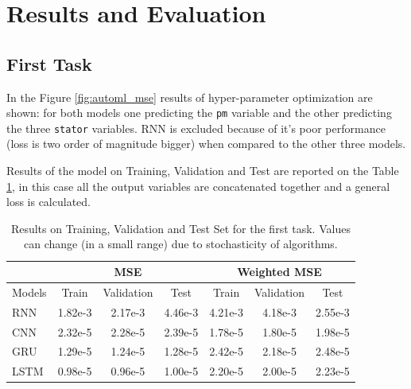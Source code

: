 \section{Results and Evaluation}
 
\subsection{First Task}
In the Figure \ref{fig:automl_mse} results of hyper-parameter optimization are shown: for both models one predicting the \verb|pm| variable and the other predicting the three \verb|stator| variables. RNN is excluded because of it's poor performance (loss is two order of magnitude bigger) when compared to the other three models.

Results of the model on Training, Validation and Test are reported on the Table \ref{tab:first}, in this case all the output variables are concatenated together and a general loss is calculated.
\begin{table}[!h]
  \centering
  \begin{tabular}{|l|c|c|c|c|c|c|}
    \hline
           & \multicolumn{3}{|c|}{MSE}      & \multicolumn{3}{|c|}{Weighted MSE} \\
    \hline
    Models & Train   & Validation & Test    & Train   & Validation & Test \\
    \hline
    RNN    & 1.82e-3 & 2.17e-3    & 4.46e-3 & 4.21e-3 & 4.18e-3    & 2.55e-3\\
    CNN    & 2.32e-5 & 2.28e-5    & 2.39e-5 & 1.78e-5 & 1.80e-5    & 1.98e-5\\
    GRU    & 1.29e-5 & 1.24e-5    & 1.28e-5 & 2.42e-5 & 2.18e-5    & 2.48e-5\\
    LSTM   & 0.98e-5 & 0.96e-5    & 1.00e-5 & 2.20e-5 & 2.00e-5    & 2.23e-5\\
    \hline
  \end{tabular}
  \caption{Results on Training, Validation and Test Set for the first task. Values can change (in a small range) due to stochasticity of algorithms.}
  \label{tab:first}
\end{table}

